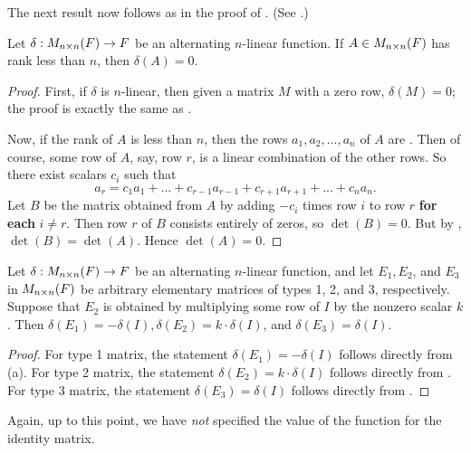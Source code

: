 The next result now follows as in the proof of . (See .)

\begin{corollary} \label{corollary 4.10.2}
Let \(\delta: M_{n \times n}(F) \to F\) be an alternating \(n\)-linear function.
If \(A \in M_{n \times n}(F)\) has rank less than \(n\), then \(\delta(A) = 0\).
\end{corollary}

\begin{proof}
First, if \(\delta\) is \(n\)-linear, then given a matrix \(M\) with a zero row, \(\delta(M) = 0\);
the proof is exactly the same as .

Now, if the rank of \(A\) is less than \(n\), then the rows \(a_1, a_2, ..., a_n\) of \(A\) are \LDP{}.
Then of course, some row of \(A\), say, row \(r\), is a linear combination of the other rows.
So there exist scalars \(c_i\) such that
\[
    a_r = c_1 a_1 + ... + c_{r - 1} a_{r - 1} + c_{r + 1} a_{r + 1} + ... + c_n a_n.
\]
Let \(B\) be the matrix obtained from \(A\) by adding \(-c_i\) times row \(i\) to row \(r\) \textbf{for each} \(i \ne r\).
Then row \(r\) of \(B\) consists entirely of zeros, so \(\det(B) = 0\).
But by , \(\det(B) = \det(A)\).
Hence \(\det(A) = 0\).
\end{proof}

\begin{corollary} \label{corollary 4.10.3}
Let \(\delta: M_{n \times n}(F) \to F\) be an alternating \(n\)-linear function,
and let \(E_1, E_2\), and \(E_3\) in \(M_{n \times n}(F)\) be arbitrary elementary matrices of types 1, 2, and 3, respectively.
Suppose that \(E_2\) is obtained by multiplying some row of \(I\) by the nonzero scalar \(k\).
Then \(\delta(E_1) = -\delta(I), \delta(E_2) = k \cdot \delta(I)\), and
\(\delta(E_3) = \delta(I)\).
\end{corollary}

\begin{proof}
For type 1 matrix, the statement \(\delta(E_1) = -\delta(I)\) follows directly from (a).
For type 2 matrix, the statement \(\delta(E_2) = k \cdot \delta(I)\) follows directly from .
For type 3 matrix, the statement \(\delta(E_3) = \delta(I)\) follows directly from .
\end{proof}

\begin{remark} \label{remark 4.5.1}
Again, up to this point, we have \emph{not} specified the value of the function for the identity matrix.
\end{remark}

